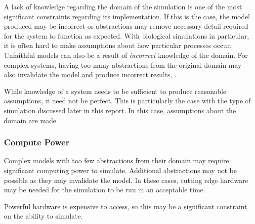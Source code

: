 \documentclass{UoYCSproject}
\begin{document}
A lack of knowledge regarding the domain of the simulation is one of the most significant constraints regarding its implementation.
If this is the case, the model produced may be incorrect or abstractions may remove necessary detail required for the system to function as expected.
With biological simulations in particular, it is often hard to make assumptions about how particular processes occur\cite{stepney_abm}.
Unfaithful models can also be a result of \textit{incorrect} knowledge of the domain.
For complex systems, having too many abstractions from the original domain may also invalidate the model and produce incorrect results\cite[p.8]{cosmos}, \cite{stepney_abm}.

While knowledge of a system needs to be sufficient to produce reasonable assumptions, it need not be perfect.
This is particularly the case with the type of simulation discussed later in this report.
In this case, assumptions about the domain are made %

\subsubsection{Compute Power}
Complex models with too few abstractions from their domain may require significant computing power to simulate. Additional abstractions may not be possible as they may invalidate the model\cite{stepney_abm}.
In these cases, cutting edge hardware may be needed for the simulation to be run in an acceptable time. 

Powerful hardware is expensive to access, so this may be a significant constraint on the ability to simulate.


\end{document}
